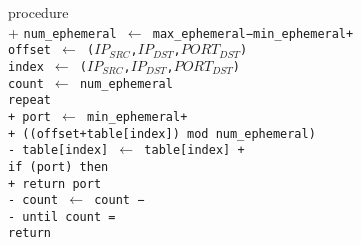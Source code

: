 
\begin{algorithm}{}{\thetcbcounter}
	\begin{pseudo}[indent-mark,kw,hl-warn=false]
		procedure  \\+
		\tt{num\_ephemeral} $\leftarrow$ \tt{max\_ephemeral}−\tt{min\_ephemeral}+ \\
		\tt{offset} $\leftarrow$ ($IP_{SRC}$,$IP_{DST}$,$PORT_{DST}$) \\
		\tt{index} $\leftarrow$ ($IP_{SRC}$,$IP_{DST}$,$PORT_{DST}$) \\
		\tt{count} $\leftarrow$ \tt{num\_ephemeral} \\
		repeat \\+
		\tt{port} $\leftarrow$ \tt{min\_ephemeral}+\\+
		((\tt{offset}+\tt{table[index]}) mod \tt{num\_ephemeral}) \\-
		\tt{table[index]} $\leftarrow$ \tt{table[index]} + \\
		if (\tt{port}) then \\+
		return \tt{port} \\-
		\tt{count} $\leftarrow$ \tt{count} −  \\-
		until \tt{count} =  \\
		return \\
	\end{pseudo}
\end{algorithm}
